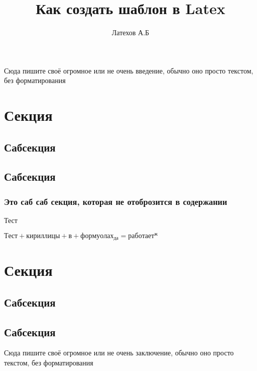 
\def\institute{Автоматики и информационных технологий}
\def\kafedra{Электроники, телекоммуникации и космических технологий}
\def\tipraboty{СРСП}
\author{Латехов А.Б}
\title{Как создать шаблон в Latex}
\def\prepod{Гончаров А.Б}
\def\shifrop{0A00000}

	
	
	\tableofcontents
	
	\newpage
	Сюда пишите своё огромное или не очень введение, обычно оно просто текстом, без форматирования
	\newpage
	
	\section{Секция}
	\subsection{Сабсекция}
	\subsection{Сабсекция}
	\subsubsection{Это саб саб секция, которая не отоброзится в содержании}
	Тест\cite{PinillaToro2019}
	
	$Тест + кириллицы + в + формуолах_{да} = работает^ж$
	
	\newpage
	
	\section{Секция}
	\subsection{Сабсекция}
	\subsection{Сабсекция}
	\newpage
	
	Сюда пишите своё огромное или не очень заключение, обычно оно просто текстом, без форматирования
	
	\newpage
	\printbibliography[heading=su]

